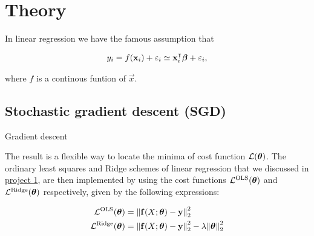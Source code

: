 \section{Theory}\label{sec:theory}

In linear regression we have the famous assumption that 

\begin{align}
    y_i = f(\mathbf{x}_i) + \varepsilon_i \simeq \mathbf{x}_i^\intercal \boldsymbol{\beta} + \varepsilon_i,
\end{align}

where $f$ is a continous funtion of $\vec{x}$.  


\subsection{Stochastic gradient descent (SGD)}\label{sec:stochastic_gradient_descent}
    Gradient descent \citep{mhjensen} 

    The result is a flexible way to locate the minima of  cost function $\mathcal{L}(\boldsymbol{\theta})$. The ordinary least squares and Ridge schemes of linear regression that we discussed in \href{https://github.com/Johanmkr/FYS-STK4155colab/tree/main/project1}{project 1}, are then implemented by using the cost functions $\mathcal{L}^\mathrm{OLS}(\boldsymbol{\theta})$ and $\mathcal{L}^\mathrm{Ridge}(\boldsymbol{\theta})$ respectively, given by the following expressions:

    \begin{subequations}\label{eq:linear_regression_cost_functions}
        \begin{align}
            \mathcal{L}^\mathrm{OLS}(\boldsymbol{\theta}) &= \norm{\mathbf{f}(X; \boldsymbol{\theta} ) - \mathbf{y}}_2^2 \label{eq:ols_cost_function}\\
            \mathcal{L}^\mathrm{Ridge}(\boldsymbol{\theta})&=\norm{\mathbf{f}(X; \boldsymbol{\theta} ) - \mathbf{y}}_2^2  -  \lambda\norm{\boldsymbol{\theta}}_2^2 \label{eq:ridge_cost_function}
        \end{align}
    \end{subequations}


